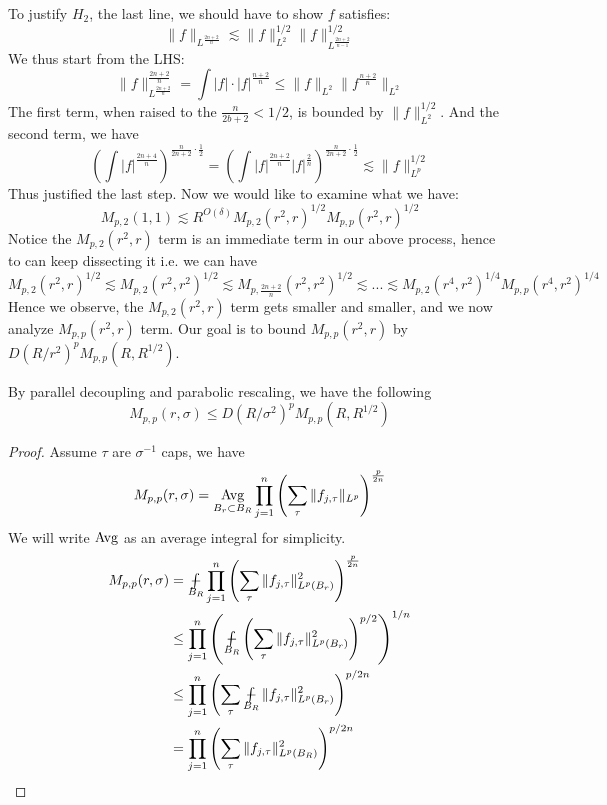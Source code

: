 To justify $H_2$, the last line, we should have to show $f$ satisfies:
\begin{equation*}
    \|f\|_{L^\frac{2n+2}{n}}\lesssim \|f\|_{L^2}^{1/2}\|f\|_{L^\frac{2n+2}{n-1}}^{1/2}
\end{equation*}
We thus start from the LHS:
\begin{equation*}
    \|f\|_{L^\frac{2n+2}{n}}^\frac{2n+2}{n}=\int|f|\cdot|f|^{\frac{n+2}{n}}\leq\|f\|_{L^2}\|f^\frac{n+2}{n}\|_{L^2}
\end{equation*}
The first term, when raised to the $\frac{n}{2b+2}<1/2$, is bounded by $\|f\|_{L^2}^{1/2}$. And the second term, we have
\begin{equation*}
    \left(\int|f|^{\frac{2n+4}{n}}\right)^{\frac{n}{2n+2}\cdot\frac{1}{2}}=\left(\int|f|^{\frac{2n+2}{n}}|f|^\frac{2}{n}\right)^{\frac{n}{2n+2}\cdot\frac{1}{2}} \lesssim \|f\|_{L^p}^{1/2}
\end{equation*}
Thus justified the last step. Now we would like to examine what we have:
\begin{equation*}
    M_{p,2}(1,1)\lesssim R^{O(\delta)}M_{p,2}(r^2,r)^{1/2}M_{p,p}(r^2,r)^{1/2}
\end{equation*}
Notice the $M_{p,2}(r^2,r)$ term is an immediate term in our above process, hence to can keep dissecting it i.e. we can have
\begin{equation*}
    M_{p,2}(r^2,r)^{1/2}\lesssim M_{p,2}(r^2, r^2)^{1/2}\lesssim M_{p,\frac{2n+2}{n}}(r^2, r^2)^{1/2}\lesssim ...\lesssim M_{p,2}(r^4, r^2)^{1/4}M_{p,p}(r^4, r^2)^{1/4}
\end{equation*}
Hence we observe, the $M_{p,2}(r^2,r)$ term gets smaller and smaller, and we now analyze $M_{p,p}(r^2,r)$ term. Our goal is to bound $M_{p,p}(r^2, r)$ by $D(R/r^2)^pM_{p,p}(R, R^{1/2})$.
\begin{proposition}
    By parallel decoupling and parabolic rescaling, we have the following
    \begin{equation*}
        M_{p,p}(r,\sigma)\leq D(R/\sigma^2)^pM_{p,p}(R, R^{1/2})
    \end{equation*}
\end{proposition}
\begin{proof} Assume $\tau$ are $\sigma^{-1}$ caps, we have
    \begin{equation*}
        M_{p,p}(r,\sigma)=\operatorname*{Avg}_{B_r\subset B_R}\prod_{j=1}^n\left(\sum_\tau\|f_{j,\tau}\|_{L^p} \right)^{\frac{p}{2n}}
    \end{equation*}
    We will write $\operatorname*{Avg}$ as an average integral for simplicity.
    \begin{align*}
        M_{p,p}(r,\sigma)&=\avint_{B_R}\prod_{j=1}^n\left(\sum_\tau\|f_{j,\tau}\|_{L^p(B_r)}^2 \right)^{\frac{p}{2n}}\\
        &\leq \prod_{j=1}^n\left(\avint_{B_R}\left(\sum_\tau\|f_{j,\tau}\|_{L^p(B_r)}^2 \right)^{p/2}\right)^{1/n}\\
        &\leq \prod_{j=1}^n\left(\sum_\tau\avint_{B_R}\|f_{j,\tau}\|_{L^p(B_r)}^2 \right)^{p/2n}\\
        &=\prod_{j=1}^n\left(\sum_\tau\|f_{j,\tau}\|_{L^p(B_R)}^2 \right)^{p/2n}
    \end{align*}
\end{proof}
